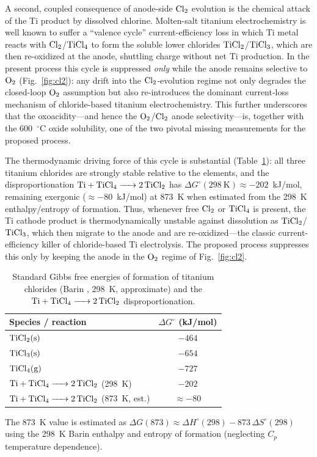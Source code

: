 \documentclass[11pt]{article}
\begin{document}
A second, coupled consequence of anode-side $\ce{Cl2}$ evolution is the chemical attack of the Ti product by dissolved chlorine. Molten-salt titanium electrochemistry is well known to suffer a ``valence cycle'' current-efficiency loss in which Ti metal reacts with $\ce{Cl2}$/$\ce{TiCl4}$ to form the soluble lower chlorides $\ce{TiCl2}$/$\ce{TiCl3}$, which are then re-oxidized at the anode, shuttling charge without net Ti production. In the present process this cycle is suppressed \emph{only} while the anode remains selective to $\ce{O2}$ (Fig.~\ref{fig:cl2}): any drift into the $\ce{Cl2}$-evolution regime not only degrades the closed-loop $\ce{O2}$ assumption but also re-introduces the dominant current-loss mechanism of chloride-based titanium electrochemistry. This further underscores that the oxoacidity---and hence the $\ce{O2}$/$\ce{Cl2}$ anode selectivity---is, together with the 600~$^{\circ}$C oxide solubility, one of the two pivotal missing measurements for the proposed process.

The thermodynamic driving force of this cycle is substantial (Table~\ref{tab:ticl}): all three titanium chlorides are strongly stable relative to the elements, and the disproportionation $\ce{Ti + TiCl4 -> 2TiCl2}$ has $\Delta G^{\circ}(298~\mathrm{K}) \approx -202$~kJ/mol, remaining exergonic ($\approx -80$~kJ/mol) at 873~K when estimated from the 298~K enthalpy/entropy of formation. Thus, whenever free $\ce{Cl2}$ or $\ce{TiCl4}$ is present, the Ti cathode product is thermodynamically unstable against dissolution as $\ce{TiCl2}$/$\ce{TiCl3}$, which then migrate to the anode and are re-oxidized---the classic current-efficiency killer of chloride-based Ti electrolysis. The proposed process suppresses this only by keeping the anode in the $\ce{O2}$ regime of Fig.~\ref{fig:cl2}.

\begin{table}[!ht]
\centering
\footnotesize
\caption{Standard Gibbs free energies of formation of titanium chlorides (Barin \cite{barin1995}, 298~K, approximate) and the $\ce{Ti + TiCl4 -> 2TiCl2}$ disproportionation.}
\label{tab:ticl}
\begin{tabular}{lc}
\toprule
Species / reaction & $\Delta G^{\circ}$ (kJ/mol) \\
\midrule
$\ce{TiCl2(s)}$ & $-464$ \\
$\ce{TiCl3(s)}$ & $-654$ \\
$\ce{TiCl4(g)}$ & $-727$ \\
$\ce{Ti + TiCl4 -> 2TiCl2}$ (298~K) & $-202$ \\
$\ce{Ti + TiCl4 -> 2TiCl2}$ (873~K, est.) & $\approx -80$ \\
\bottomrule
\end{tabular}

\par\footnotesize The 873~K value is estimated as $\Delta G(873) \approx \Delta H^{\circ}(298) - 873\,\Delta S^{\circ}(298)$ using the 298~K Barin enthalpy and entropy of formation (neglecting $C_p$ temperature dependence).
\end{table}
\end{document}
